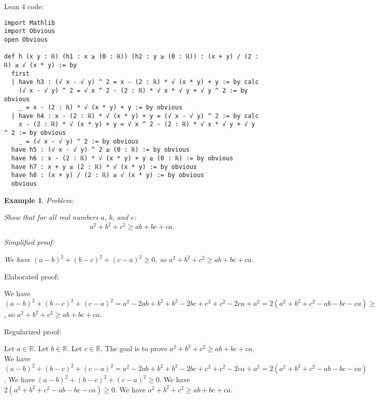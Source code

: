 \documentclass{article}
\newtheorem{example}{Example}
\begin{document}
Lean 4 code:
\begin{tcolorbox}[colback=white!10, width=\linewidth]
\begin{lstlisting}[language=Lean4]
import Mathlib
import Obvious
open Obvious

def h (x y : ℝ) (h1 : x ≥ (0 : ℝ)) (h2 : y ≥ (0 : ℝ)) : (x + y) / (2 : ℝ) ≥ √ (x * y) := by
  first
  | have h3 : (√ x - √ y) ^ 2 = x - (2 : ℝ) * √ (x * y) + y := by calc
    (√ x - √ y) ^ 2 = √ x ^ 2 - (2 : ℝ) * √ x * √ y + √ y ^ 2 := by obvious
    _ = x - (2 : ℝ) * √ (x * y) + y := by obvious
  | have h4 : x - (2 : ℝ) * √ (x * y) + y = (√ x - √ y) ^ 2 := by calc
    x - (2 : ℝ) * √ (x * y) + y = √ x ^ 2 - (2 : ℝ) * √ x * √ y + √ y ^ 2 := by obvious
    _ = (√ x - √ y) ^ 2 := by obvious
  have h5 : (√ x - √ y) ^ 2 ≥ (0 : ℝ) := by obvious
  have h6 : x - (2 : ℝ) * √ (x * y) + y ≥ (0 : ℝ) := by obvious
  have h7 : x + y ≥ (2 : ℝ) * √ (x * y) := by obvious
  have h8 : (x + y) / (2 : ℝ) ≥ √ (x * y) := by obvious
  obvious

\end{lstlisting}
\end{tcolorbox}


\begin{example}
Problem:
\begin{tcolorbox}[colback=yellow!10, width=\linewidth]
Show that for all real numbers $a$, $b$, and $c$:
    $$a^2 + b^2 + c^2 \geq ab + bc + ca.$$
\end{tcolorbox}

Simplified proof:
\begin{tcolorbox}[colback=blue!10, width=\linewidth]
We have $(a-b)^2+(b-c)^2+(c-a)^2 \ge 0$, so $a^2+b^2+c^2 \ge ab+bc+ca$.
\end{tcolorbox}
\end{example}

Elaborated proof:
\begin{tcolorbox}[colback=green!10, width=\linewidth]
We have $(a-b)^2+(b-c)^2+(c-a)^2 = a^2 - 2ab + b^2 + b^2 - 2bc + c^2 + c^2 - 2ca + a^2 = 2(a^2+b^2+c^2 - ab - bc - ca) \ge 0$, so $a^2+b^2+c^2 \ge ab+bc+ca$.
\end{tcolorbox}

Regularized proof:
\begin{tcolorbox}[colback=red!10, width=\linewidth]
Let $a\in\mathbb{R}$.
Let $b\in\mathbb{R}$.
Let $c\in\mathbb{R}$.
The goal is to prove $a^2+b^2+c^2 \ge ab+bc+ca$.
We have ${{(a-b)}}^2+{{(b-c)}}^2+{{(c-a)}}^2 = a^2 - 2ab + b^2 + b^2 - 2bc + c^2 + c^2 - 2ca + a^2 = 2(a^2+b^2+c^2 - ab - bc - ca)$.
We have ${{(a-b)}}^2+{{(b-c)}}^2+{{(c-a)}}^2 \ge 0$.
We have $2(a^2+b^2+c^2 - ab - bc - ca) \ge 0$.
We have $a^2+b^2+c^2 \ge ab+bc+ca$.
\end{tcolorbox}
\end{document}
